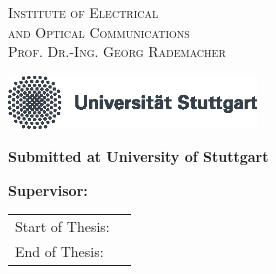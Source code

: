 %
%


\begin{titlepage}
	\begin{minipage}{0.55\linewidth}
		\textsc{Institute of Electrical  \\
			and Optical Communications \\
			Prof. Dr.-Ing. Georg Rademacher}
	\end{minipage}
	\begin{minipage}{0.5\linewidth}
		\hfill \includegraphics[height=1.4cm]{Bilder/eps/unistuttgart_logo_deutsch_cmyk}

	\end{minipage}

	
	\begin{center}															%
		
		\vspace{25mm}														%


		\begin{LARGE}
			\textsf{\textbf{\worktitle}}
		\end{LARGE}

		\vspace{7mm}														%

		\begin{large}
			\textsf{\textbf{\worktitleEnglish}}
		\end{large}

		\vspace{10mm}														%

		\textsf{\textbf{\worksubject}}
		
		\textsf{\textbf{Submitted at University of Stuttgart}}

		\vspace{7mm}														%

		\textsf{\textbf{\student}}

		\vspace{15mm}														%

		\textsf{\textbf{Supervisor: \tutor}}

		\vfill																%
		
  	\begin{minipage}[t]{.8\textwidth}										%
	  	\begin{tabular}[h]{l l}												%
				Start of Thesis: & \startdate \\
				End of Thesis: & \submission 
  	 	\end{tabular}
		\end{minipage}    
	\end{center}

\end{titlepage}
